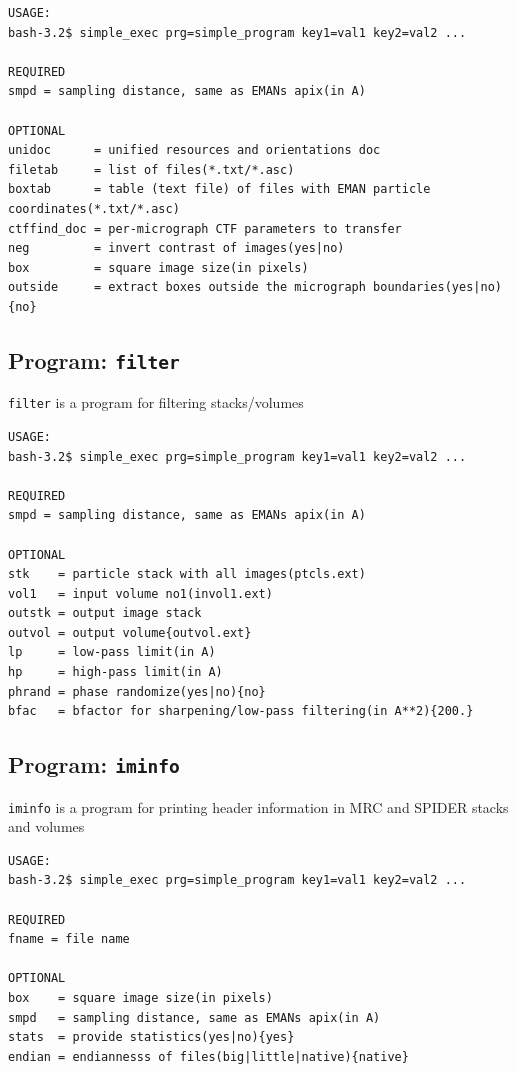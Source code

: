 \documentclass[a4paper,11pt]{article}
\newcommand{\prgname}[1]{\textcolor{NavyBlue}{\texttt{#1}}}
\begin{document}
\begin{verbatim}
USAGE:
bash-3.2$ simple_exec prg=simple_program key1=val1 key2=val2 ...

REQUIRED
smpd = sampling distance, same as EMANs apix(in A)

OPTIONAL
unidoc      = unified resources and orientations doc
filetab     = list of files(*.txt/*.asc)
boxtab      = table (text file) of files with EMAN particle coordinates(*.txt/*.asc)
ctffind_doc = per-micrograph CTF parameters to transfer
neg         = invert contrast of images(yes|no)
box         = square image size(in pixels)
outside     = extract boxes outside the micrograph boundaries(yes|no){no}
\end{verbatim}

\subsection{Program: \prgname{filter}}
\label{filter}
\prgname{filter} is a program for filtering stacks/volumes 

\begin{verbatim}
USAGE:
bash-3.2$ simple_exec prg=simple_program key1=val1 key2=val2 ...

REQUIRED
smpd = sampling distance, same as EMANs apix(in A)

OPTIONAL
stk    = particle stack with all images(ptcls.ext)
vol1   = input volume no1(invol1.ext)
outstk = output image stack
outvol = output volume{outvol.ext}
lp     = low-pass limit(in A)
hp     = high-pass limit(in A)
phrand = phase randomize(yes|no){no}
bfac   = bfactor for sharpening/low-pass filtering(in A**2){200.}
\end{verbatim}

\subsection{Program: \prgname{iminfo}}
\label{iminfo}
\prgname{iminfo} is a program for printing header information in MRC and SPIDER stacks and volumes

\begin{verbatim}
USAGE:
bash-3.2$ simple_exec prg=simple_program key1=val1 key2=val2 ...

REQUIRED
fname = file name

OPTIONAL
box    = square image size(in pixels)
smpd   = sampling distance, same as EMANs apix(in A)
stats  = provide statistics(yes|no){yes}
endian = endiannesss of files(big|little|native){native}
\end{verbatim}
\end{document}
